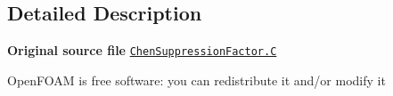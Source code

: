 \subsection{Detailed Description}
{\bfseries Original source file} \href{../../../home/carlo/data/GeN-Foam/GeN-Foam_ffn/GeN-Foam/GeN-Foam/classes/thermalHydraulics/src/physicsModels/heatTransferModels/FSHeatTransferCoefficientModels/subModels/suppressionFactorModels/Chen/ChenSuppressionFactor.C}{\tt Chen\+Suppression\+Factor.\+C}

Open\+F\+O\+AM is free software\+: you can redistribute it and/or modify it 